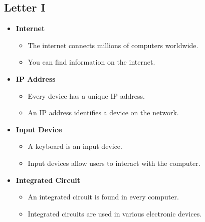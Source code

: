 \subsection{Letter I}
\begin{itemize}
    \item \textbf{Internet}
    \begin{itemize}
        \item The internet connects millions of computers worldwide.
        \item You can find information on the internet.
    \end{itemize}
    \item \textbf{IP Address}
    \begin{itemize}
        \item Every device has a unique IP address.
        \item An IP address identifies a device on the network.
    \end{itemize}
    \item \textbf{Input Device}
    \begin{itemize}
        \item A keyboard is an input device.
        \item Input devices allow users to interact with the computer.
    \end{itemize}
    \item \textbf{Integrated Circuit}
    \begin{itemize}
        \item An integrated circuit is found in every computer.
        \item Integrated circuits are used in various electronic devices.
    \end{itemize}
\end{itemize}

